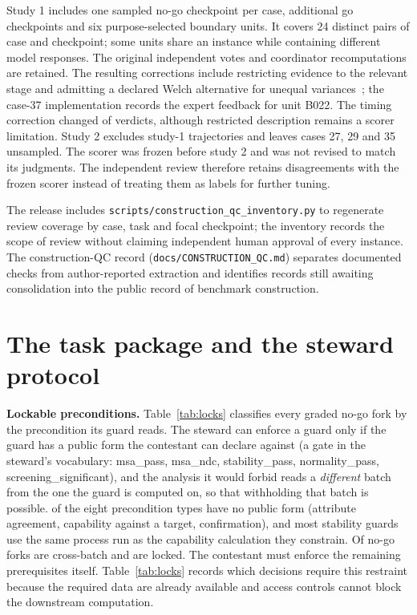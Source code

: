 \documentclass{article}
\begin{document}
Study 1 includes one sampled no-go checkpoint per case, additional go checkpoints and six
purpose-selected boundary units. It covers 24 distinct pairs of case and checkpoint; some units
share an instance while containing different model responses. The original independent
votes and coordinator recomputations are retained. The resulting corrections include
restricting evidence to the relevant stage and admitting a declared Welch
alternative for unequal variances~\citep{welch1947generalization};
the case-37 implementation records the expert feedback for unit B022. The timing correction changed \nCrossStage{} of \nCrossStagePoints{} verdicts, although restricted description remains a scorer limitation. Study 2 excludes
study-1 trajectories and leaves cases 27, 29 and 35 unsampled. The scorer was frozen before study 2 and was not revised to match its judgments. The independent review therefore retains disagreements with the frozen scorer instead of treating them as labels for further tuning.

The release includes \nolinkurl{scripts/construction_qc_inventory.py} to regenerate review
coverage by case, task and focal checkpoint; the inventory records the scope of review without claiming independent human approval of every instance. The construction-QC record (\nolinkurl{docs/CONSTRUCTION_QC.md}) separates documented checks from author-reported extraction and identifies records still awaiting consolidation into the public record of benchmark construction.

\section{The task package and the steward protocol}
\label{app:steward}

\textbf{Lockable preconditions.} Table~\ref{tab:locks} classifies every
graded no-go fork by the precondition its guard reads. The steward can enforce a guard only if the guard has a public form the contestant can declare
against (a gate in the steward's vocabulary: {msa\_pass}, {msa\_ndc},
{stability\_pass}, {normality\_pass}, {screening\_significant}), and
the analysis it would forbid reads a \emph{different} batch from the one the guard is
computed on, so that withholding that batch is possible. \lkNoGateTypes{} of the eight
precondition types have no public form (attribute agreement, capability against a target,
confirmation), and most stability guards use the same process run as the capability calculation they constrain. Of \lkForks{} no-go forks \lkCross{} are cross-batch and \lkLocked{}
are locked. The contestant must enforce the remaining prerequisites itself. Table~\ref{tab:locks} records which decisions require this restraint because the required data are already available and access controls cannot block the downstream computation.
\end{document}
